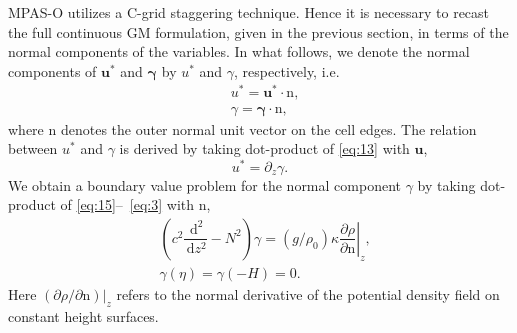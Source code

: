 \documentclass[12pt]{report}
\def\p{\partial}
\def\bs{\boldsymbol}
\def\ud{\,\mathrm{d}}
\def\ub{\mathbf{u}}
\def\nb{\bs{\mathrm{n}}}
\begin{document}
MPAS-O utilizes a C-grid staggering technique. Hence it is necessary
to recast the full continuous GM formulation, given in the previous
section, in terms of the normal components of the variables. In what
follows, we denote the normal components of $\ub^\ast$ and
$\bs{\gamma}$ by $u^\ast$ and $\gamma$, respectively, i.e.
\begin{align}
  &u^\ast = \ub^\ast\cdot\nb,\label{eq:16}\\
  &\gamma = \bs{\gamma}\cdot\nb,\label{eq:17}
\end{align}
where $\nb$ denotes the outer normal unit vector on the cell
edges. The relation between $u^\ast$ and $\gamma$ is derived by
taking dot-product of \eqref{eq:13} with $\ub$,
\begin{equation}
  \label{eq:18}
  u^\ast = \p_z \gamma.
\end{equation}
We obtain a boundary value problem for the normal component $\gamma$ by
taking dot-product of \eqref{eq:15}--~\eqref{eq:3} with $\nb$,
\begin{align}
  &\left( c^2\dfrac{\ud^2}{\ud z^2} - N^2\right){\gamma} =
  \left.(g/\rho_0)\kappa \dfrac{\p \rho}{\p \mathrm{n}}\right|_z,\label{eq:19}\\
  &{\gamma}(\eta) = {\gamma}(-H) = 0.\label{eq:20}
\end{align}
Here $(\p \rho/\p\mathrm{n})|_z$ refers to the normal derivative of
the potential density field on constant height surfaces.

\end{document}
